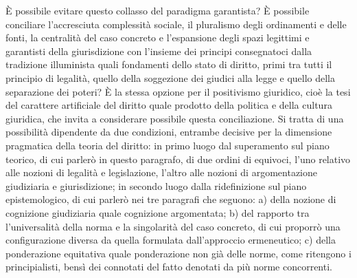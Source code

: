 È possibile evitare questo collasso del paradigma garantista? È possibile conciliare l’accresciuta complessità sociale, il pluralismo degli ordinamenti e delle fonti, la centralità del caso concreto e l’espansione degli spazi legittimi e garantisti della giurisdizione con l’insieme dei principi consegnatoci dalla tradizione illuminista quali fondamenti dello stato di diritto, primi tra tutti il principio di legalità, quello della soggezione dei giudici alla legge e quello della separazione dei poteri? È la stessa opzione per il positivismo giuridico, cioè la tesi del carattere artificiale del diritto quale prodotto della politica e della cultura giuridica, che invita a considerare possibile questa conciliazione. Si tratta di una possibilità dipendente da due condizioni, entrambe decisive per la dimensione pragmatica della teoria del diritto: in primo luogo dal superamento sul piano teorico, di cui parlerò in questo paragrafo, di due ordini di equivoci, l’uno relativo alle nozioni di legalità e legislazione, l’altro alle nozioni di argomentazione giudiziaria e giurisdizione; in secondo luogo dalla ridefinizione sul piano epistemologico, di cui parlerò nei tre paragrafi che seguono: a) della nozione di cognizione giudiziaria quale cognizione argomentata; b) del rapporto tra l’universalità della norma e la singolarità del caso concreto, di cui proporrò una configurazione diversa da quella formulata dall’approccio ermeneutico; c) della ponderazione equitativa quale ponderazione non già delle norme, come ritengono i principialisti, bensì dei connotati del fatto denotati da più norme concorrenti.

